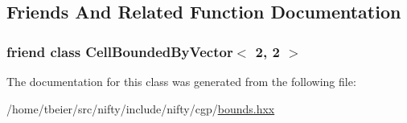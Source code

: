 \subsection{Friends And Related Function Documentation}
\hypertarget{classnifty_1_1cgp_1_1CellBoundedBy_3_012_00_012_01_4_ac693d488f7701019d117083cebc4508b}{}
\subsubsection[{Cell\+Bounded\+By\+Vector$<$ 2, 2 $>$}]{\setlength{\rightskip}{0pt plus 5cm}friend class {\bf Cell\+Bounded\+By\+Vector}$<$ 2, 2 $>$\hspace{0.3cm}{\ttfamily [friend]}}\label{classnifty_1_1cgp_1_1CellBoundedBy_3_012_00_012_01_4_ac693d488f7701019d117083cebc4508b}


The documentation for this class was generated from the following file\+:\begin{DoxyCompactItemize}
\item 
/home/tbeier/src/nifty/include/nifty/cgp/\hyperlink{bounds_8hxx}{bounds.\+hxx}\end{DoxyCompactItemize}
